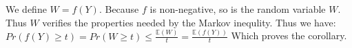 We define $W=f(Y)$. Because $f$ is non-negative, so is the random variable $W$. Thus $W$ verifies the properties needed by the Markov inequlity. Thus we have:
\newline
$Pr(f(Y) \geq t ) = Pr(W \geq t) \leq \frac{\mathbb{E}(W)}{t} = \frac{\mathbb{E}(f(Y))}{t}$
\newline
Which proves the corollary.